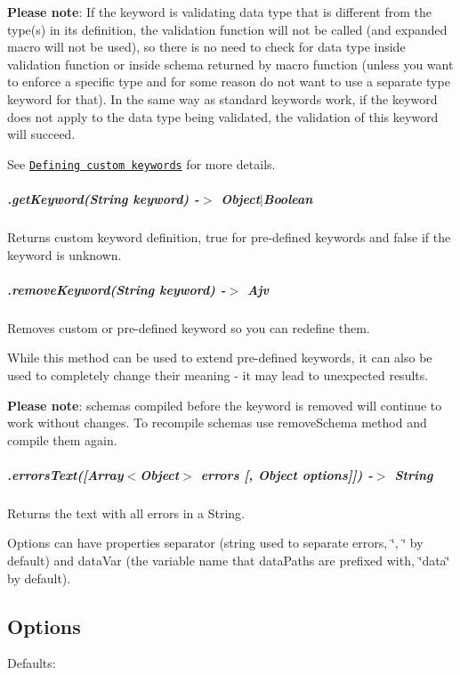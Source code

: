 {\bfseries Please note}\+: If the keyword is validating data type that is different from the type(s) in its definition, the validation function will not be called (and expanded macro will not be used), so there is no need to check for data type inside validation function or inside schema returned by macro function (unless you want to enforce a specific type and for some reason do not want to use a separate {\ttfamily type} keyword for that). In the same way as standard keywords work, if the keyword does not apply to the data type being validated, the validation of this keyword will succeed.

See \href{#defining-custom-keywords}{\tt Defining custom keywords} for more details.

\subparagraph*{.get\+Keyword(\+String keyword) -\/$>$ Object$\vert$\+Boolean}

Returns custom keyword definition, {\ttfamily true} for pre-\/defined keywords and {\ttfamily false} if the keyword is unknown.

\subparagraph*{.remove\+Keyword(\+String keyword) -\/$>$ Ajv}

Removes custom or pre-\/defined keyword so you can redefine them.

While this method can be used to extend pre-\/defined keywords, it can also be used to completely change their meaning -\/ it may lead to unexpected results.

{\bfseries Please note}\+: schemas compiled before the keyword is removed will continue to work without changes. To recompile schemas use {\ttfamily remove\+Schema} method and compile them again.

\subparagraph*{.errors\+Text(\mbox{[}Array$<$Object$>$ errors \mbox{[}, Object options\mbox{]}\mbox{]}) -\/$>$ String}

Returns the text with all errors in a String.

Options can have properties {\ttfamily separator} (string used to separate errors, \char`\"{}, \char`\"{} by default) and {\ttfamily data\+Var} (the variable name that data\+Paths are prefixed with, \char`\"{}data\char`\"{} by default).

\subsection*{Options}

Defaults\+:


